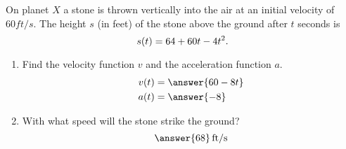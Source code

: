 \documentclass{ximera}
\begin{document}
\begin{exercise}
On planet $X$ a stone is thrown vertically into the air at an initial velocity of $60\unit{ft/s}$. The height $s$ (in feet) of the stone above the ground after $t$ seconds is
\[
s(t)=64+60t-4t^2\ldotp
\]
\begin{enumerate}
\item Find the velocity function $v$ and the acceleration function $a$. 
\begin{align*}
v(t)&=\answer{60-8t}\\
a(t)&=\answer{-8}
\end{align*}
\item With what speed will the stone strike the ground? \[\answer{68}\unit{ft/s}\] %
\end{enumerate}





\end{exercise}
\end{document}
